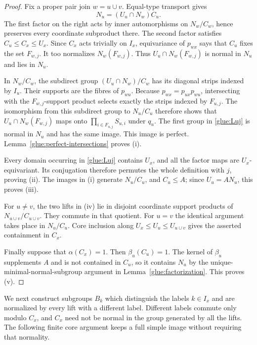 \begin{proof}
Fix a proper pair join $w=u\cup v$.  Equal-type transport gives
\begin{equation}\label{glue:Nu-transport}
                  N_u=(U_u\cap N_w)C_u.
\end{equation}
The first factor on the right acts by inner automorphisms on
$N_w/C_w$, hence preserves every coordinate subproduct there.
The second factor satisfies $C_u\le C_x\le U_x$.  Since $C_x$ acts
trivially on $I_x$, equivariance of $p_{wx}$ says that $C_u$ fixes the
set $F_{w,j}$.  It too normalizes $N_w(F_{w,j})$.
Thus $U_u\cap N_w(F_{w,j})$ is normal in $N_u$ and lies in $N_u$.

In $N_w/C_w$, the subdirect group $(U_u\cap N_w)/C_w$ has its diagonal
strips indexed by $I_u$.  Their supports are the fibres of $p_{wu}$.
Because $p_{wx}=p_{ux}p_{wu}$, intersecting with the $F_{w,j}$-support
product selects exactly the strips indexed by $F_{u,j}$.
The isomorphism from this subdirect group to $N_u/C_u$ therefore shows
that $U_u\cap N_w(F_{w,j})$ maps onto
$\prod_{i\in F_{u,j}}S_{u,i}$ under $q_u$.
The first group in \eqref{glue:Luj} is normal in $N_u$ and has the same
image.  This image is perfect.  Lemma~\ref{glue:perfect-intersections}
proves (i).

Every domain occurring in \eqref{glue:Luj} contains $U_x$, and all the
factor maps are $U_x$-equivariant.  Its conjugation therefore permutes
the whole definition with $j$, proving (ii).  The images in (i)
generate $N_u/C_u$, and $C_u\le A$; since $U_u=AN_u$, this proves (iii).

For $u\ne v$, the two lifts in (iv) lie in disjoint coordinate support
products of $N_{u\cup v}/C_{u\cup v}$.  They commute in that quotient.
For $u=v$ the identical argument takes place in $N_u/C_u$.
Core inclusion along $U_x\le U_u\le U_{u\cup v}$ gives the asserted
containment in $C_x$.

Finally suppose that $\alpha(C_x)=1$.  Then $\beta_u(C_u)=1$.
The kernel of $\beta_u$ supplements $A$ and is not contained in $C_u$,
so it contains $N_u$ by the unique-minimal-normal-subgroup argument in
Lemma~\ref{glue:factorization}.  This proves (v).
\end{proof}

We next construct subgroups $B_k$ which distinguish the labels
$k\in I_x$ and are normalized by every lift with a different label.
Different labels commute only modulo $C_x$, and $C_x$ need not be
normal in the group generated by all the lifts.  The following finite
core argument keeps a full simple image without requiring that
normality.

